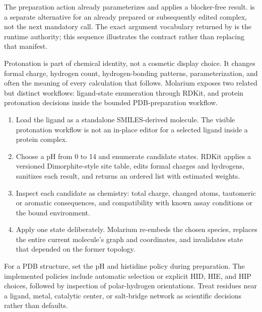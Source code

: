 \documentclass[11pt]{article}
\begin{document}
The preparation action already parameterizes and applies a blocker-free result.  is a separate alternative for an already prepared or subsequently edited complex, not the next mandatory call. The exact argument vocabulary returned by  is the runtime authority; this sequence illustrates the contract rather than replacing that manifest.


Protonation is part of chemical identity, not a cosmetic display choice. It changes formal charge, hydrogen count, hydrogen-bonding patterns, parameterization, and often the meaning of every calculation that follows. Molarium exposes two related but distinct workflows: ligand-state enumeration through RDKit, and protein protonation decisions inside the bounded PDB-preparation workflow.


\begin{enumerate}
\item Load the ligand as a standalone SMILES-derived molecule. The visible protonation workflow is not an in-place editor for a selected ligand inside a protein complex.
\item Choose a pH from 0 to 14 and enumerate candidate states. RDKit applies a versioned Dimorphite-style site table, edits formal charges and hydrogens, sanitizes each result, and returns an ordered list with estimated weights.
\item Inspect each candidate as chemistry: total charge, changed atoms, tautomeric or aromatic consequences, and compatibility with known assay conditions or the bound environment.
\item Apply one state deliberately. Molarium re-embeds the chosen species, replaces the entire current molecule's graph and coordinates, and invalidates state that depended on the former topology.
\end{enumerate}


For a PDB structure, set the pH and histidine policy during preparation. The implemented policies include automatic selection or explicit HID, HIE, and HIP choices, followed by inspection of polar-hydrogen orientations. Treat residues near a ligand, metal, catalytic center, or salt-bridge network as scientific decisions rather than defaults.
\end{document}
